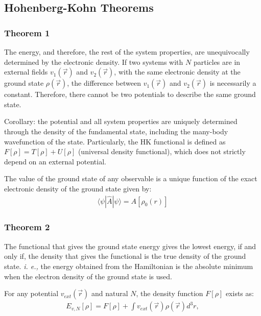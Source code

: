 
\subsection{Hohenberg-Kohn Theorems}\label{HKteoremitas}
\subsubsection{Theorem 1~\cite{Hohenberg1964}}

The energy, and therefore, the rest of the system properties, are unequivocally
determined by the electronic density. If two systems with $N$ particles are in
external fields $v_{1} (\vec{r})$ and $v_{2} (\vec{r})$, with the same
electronic density at the ground state $\rho(\vec{r})$, the difference between
$v_{1} (\vec{r})$ and $v_{2} (\vec{r})$ is necessarily a constant. Therefore,
there cannot be two potentials to describe the same ground state.

Corollary: the potential and all system properties are uniquely determined
through the density of the fundamental state, including the many-body
wavefunction of the state. Particularly, the \gls{HK} functional is defined as
$F[\rho]=T[\rho]+U[\rho]$ (universal density functional), 
which does not strictly depend on an external potential.

\pagebreak

The value of the ground state of any observable is a unique function of the exact electronic
density of the ground state given by:
\begin{align}
\langle \psi |\widehat{A}|\psi \rangle = A[\rho_0 (r)]
\end{align}

\subsubsection{Theorem 2}

The functional that gives the ground state energy gives the lowest energy, if and
only if, the density that gives the functional is the true density of the ground
state. \textit{i. e.,} the energy obtained from the Hamiltonian is the
absolute minimum when the electron density of the ground state is used.

For any potential $v_{ext}(\vec{r})$ and natural $N$, the density function $F[\rho]$
exists as:
%
\begin{align}
E_{v, N} [\rho] = F[\rho] + \int v_{ext}(\vec{r})\rho(\vec{r}) d^{3}r ,
\end{align}

